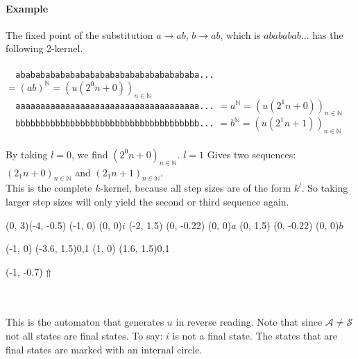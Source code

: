 \documentclass{article}
\begin{document}
\paragraph{Example}
The fixed point of the substitution $a \rightarrow ab$, $b \rightarrow ab$,
which is $abababab...$ has the following 2-kernel.\\
\\
\verb#  ababababababababababababababababababa...#
$= (ab)^\mathbb{N} = (u(2^0 n + 0))_{n \in \mathbb{N}}$\\
\verb#  aaaaaaaaaaaaaaaaaaaaaaaaaaaaaaaaaaaaa...#
$= a^\mathbb{N} = (u(2^1 n + 0))_{n \in \mathbb{N}}$\\
\verb#  bbbbbbbbbbbbbbbbbbbbbbbbbbbbbbbbbbbbb...#
$= b^\mathbb{N} = (u(2^1 n + 1))_{n \in \mathbb{N}}$\\
\\
By taking $l = 0$, we find $(2^0 n + 0)_{n \in \mathbb{N}}$. $l = 1$ Gives
two sequences: $(2_1 n + 0)_{n \in \mathbb{N}}$ and
$(2_1 n + 1)_{n \in \mathbb{N}}$.\\
This is the complete $k$-kernel, because all step sizes are of the form
$k^l$. So taking larger step sizes will only yield the second or third
sequence again.\\
\begin{graph}(0, 3)(-4, -0.5)
  (-1, 0) (0, 0){$i$}
  (-2, 1.5)
    (0, -0.22){} (0, 0){$a$}
  (0, 1.5)
    (0, -0.22){} (0, 0){$b$}

   
   
  (-1, 0) \freetext(-3.6, 1.5){0,1}
  (1, 0) \freetext(1.6, 1.5){0,1}

  \freetext(-1, -0.7){$\Uparrow$}
\end{graph}\\
\\
This is the automaton that generates $u$ in reverse reading. Note that since
$\mathcal{A \ne S}$ not all states are final states. To say: $i$ is not a
final state. The states that are final states are marked with an internal
circle.
\end{document}
